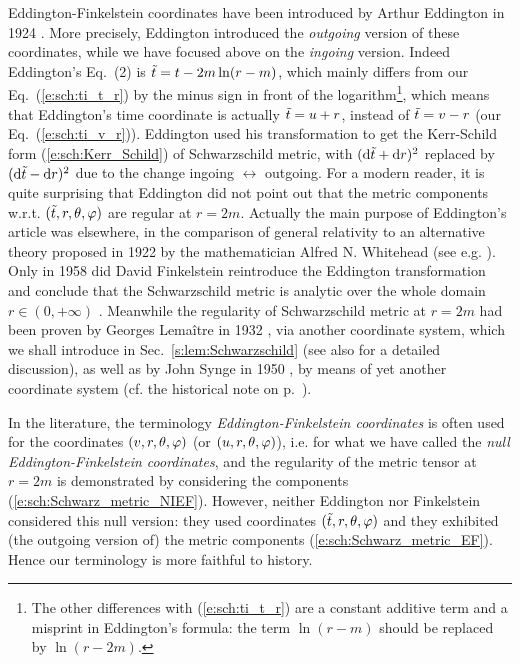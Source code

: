 \begin{hist} \label{n:sch:Eddington_coord}
Eddington-Finkelstein coordinates have been introduced by
Arthur Eddington in 1924 \cite{Eddin1924}. More precisely, Eddington
introduced the \emph{outgoing} version of these coordinates,
while we have focused above on the \emph{ingoing} version. Indeed
Eddington's Eq.~(2) is ${\tilde t} = t - 2m \ln(r-m)$, which mainly differs from
our Eq.~(\ref{e:sch:ti_t_r}) by the minus sign in front of the logarithm\footnote{The other differences with (\ref{e:sch:ti_t_r}) are a constant additive term
and a misprint in Eddington's formula: the term $\ln(r-m)$ should be replaced
by $\ln(r-2m)$.},
which means that Eddington's time coordinate is actually ${\tilde t} = u + r$, instead of
${\tilde t} = v - r$ (our Eq.~(\ref{e:sch:ti_v_r})). Eddington used his transformation
to get the Kerr-Schild form (\ref{e:sch:Kerr_Schild}) of Schwarzschild metric,
with $(\mathrm{d} {\tilde t} + \mathrm{d} r)^2$ replaced by $(\mathrm{d} {\tilde t} - \mathrm{d} r)^2$ due to the change
ingoing $\leftrightarrow$ outgoing. For a modern reader, it is quite surprising
that Eddington did not point out that the metric components w.r.t. $({\tilde t},r,\theta,\varphi)$
are regular at $r=2m$. Actually the main purpose of Eddington's article
\cite{Eddin1924} was elsewhere, in the comparison of general relativity to an alternative theory proposed in 1922 by the mathematician Alfred N. Whitehead
(see e.g. \cite{GibboW08}).
Only in 1958 did David Finkelstein reintroduce the Eddington transformation
and conclude that the Schwarzschild metric is analytic over the whole domain
$r\in(0,+\infty)$ \cite{Finke58}. Meanwhile the regularity of Schwarzschild metric
at $r=2m$ had been proven by Georges Lemaître in 1932 \cite{Lemai32}, via
another coordinate system, which we shall introduce in
Sec.~\ref{s:lem:Schwarzschild} (see also \cite{Eisen93} for a detailed discussion),
as well as by John Synge in 1950 \cite{Synge50}, by means of yet another coordinate
system (cf. the historical note on p.~\pageref{n:max:KS_coord}).
\end{hist}

\begin{remark}
In the literature, the terminology \emph{Eddington-Finkelstein coordinates}
is often used for the coordinates $(v,r,\theta,\varphi)$ (or $(u,r,\theta,\varphi)$),
i.e. for what we have called the \emph{null Eddington-Finkelstein coordinates},
and the regularity of the metric tensor at $r=2m$ is demonstrated by
considering the components (\ref{e:sch:Schwarz_metric_NIEF}).
However, neither
Eddington \cite{Eddin1924} nor Finkelstein \cite{Finke58}
considered this null version: they used coordinates $({\tilde t},r,\theta,\varphi)$
and they exhibited (the outgoing version of) the
metric components (\ref{e:sch:Schwarz_metric_EF}).
Hence our terminology is more faithful to history.
\end{remark}




